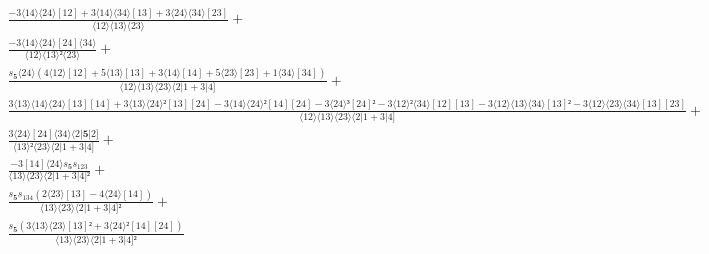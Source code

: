 \documentclass[varwidth, border=5pt]{standalone}
\begin{document}
\begin{my}
$\begin{gathered}
\scriptscriptstyle\frac{-3⟨14⟩⟨24⟩[12]+3⟨14⟩⟨34⟩[13]+3⟨24⟩⟨34⟩[23]}{⟨12⟩⟨13⟩⟨23⟩} +\\
\scriptscriptstyle\frac{-3⟨14⟩⟨24⟩[24]⟨34⟩}{⟨12⟩⟨13⟩²⟨23⟩} +\\
\scriptscriptstyle\frac{s_{𝟓}⟨24⟩(4⟨12⟩[12]+5⟨13⟩[13]+3⟨14⟩[14]+5⟨23⟩[23]+1⟨34⟩[34])}{⟨12⟩⟨13⟩⟨23⟩⟨2|1+3|4]} +\\
\scriptscriptstyle\frac{3⟨13⟩⟨14⟩⟨24⟩[13][14]+3⟨13⟩⟨24⟩²[13][24]-3⟨14⟩⟨24⟩²[14][24]-3⟨24⟩³[24]²-3⟨12⟩²⟨34⟩[12][13]-3⟨12⟩⟨13⟩⟨34⟩[13]²-3⟨12⟩⟨23⟩⟨34⟩[13][23]}{⟨12⟩⟨13⟩⟨23⟩⟨2|1+3|4]} +\\
\scriptscriptstyle\frac{3⟨24⟩[24]⟨34⟩⟨2|𝟓|2]}{⟨13⟩²⟨23⟩⟨2|1+3|4]} +\\
\scriptscriptstyle\frac{-3[14]⟨24⟩s_{𝟓}s_{123}}{⟨13⟩⟨23⟩⟨2|1+3|4]²} +\\
\scriptscriptstyle\frac{s_{𝟓}s_{134}(2⟨23⟩[13]-4⟨24⟩[14])}{⟨13⟩⟨23⟩⟨2|1+3|4]²} +\\
\scriptscriptstyle\frac{s_{𝟓}(3⟨13⟩⟨23⟩[13]²+3⟨24⟩²[14][24])}{⟨13⟩⟨23⟩⟨2|1+3|4]²} \phantom{+}
\end{gathered}$
\end{my}
\end{document}
